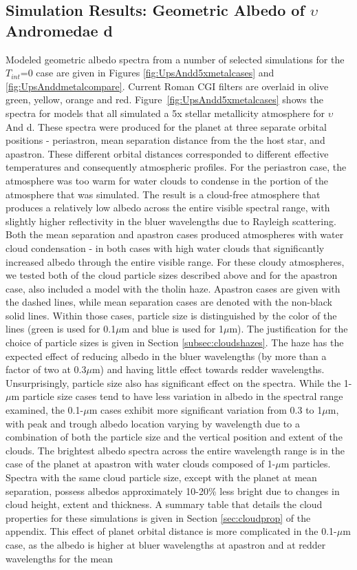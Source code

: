 \documentclass[12pt, letterpaper]{aastex631}
\begin{document}
\subsection{Simulation Results: Geometric Albedo of $\upsilon$ Andromedae d} \label{subsec:geoalbedo}

Modeled geometric albedo spectra from a number of selected simulations for the $T_{int}$=0 case are given in Figures \ref{fig:UpsAndd5xmetalcases} and \ref{fig:UpsAnddmetalcompare}. Current Roman CGI filters are overlaid in olive green, yellow, orange and red.  Figure~\ref{fig:UpsAndd5xmetalcases} shows the spectra for models that all simulated a 5x stellar metallicity atmosphere for $\upsilon$ And d.  These spectra were produced for the planet at three separate orbital positions - periastron, mean separation distance from the the host star, and apastron.  These different orbital distances corresponded to different effective temperatures and consequently atmospheric profiles.  For the periastron case, the atmosphere was too warm for water clouds to condense in the portion of the atmosphere that was simulated.  The result is a cloud-free atmosphere that produces a relatively low albedo across the entire visible spectral range, with slightly higher reflectivity in the bluer wavelengths due to Rayleigh scattering. Both the mean separation and apastron cases produced atmospheres with water cloud condensation - in both cases with high water clouds that significantly increased albedo through the entire visible range. For these cloudy atmospheres, we tested both of the cloud particle sizes described above and for the apastron case, also included a model with the tholin haze.  Apastron cases are given with the dashed lines, while mean separation cases are denoted with the non-black solid lines.  Within those cases, particle size is distinguished by the color of the lines (green is used for 0.1\;$\mu$m and blue is used for 1\;$\mu$m). The justification for the choice of particle sizes is given in Section \ref{subsec:cloudshazes}. The haze has the expected effect of reducing albedo in the bluer wavelengths (by more than a factor of two at 0.3\;$\mu$m) and having little effect towards redder wavelengths.  Unsurprisingly, particle size also has significant effect on the spectra.  While the 1-$\mu$m particle size cases tend to have less variation in albedo in the spectral range examined, the 0.1-$\mu$m cases exhibit more significant variation from 0.3 to 1\;$\mu$m, with peak and trough albedo location varying by wavelength due to a combination of both the particle size and the vertical position and extent of the clouds.  The brightest albedo spectra across the entire wavelength range is in the case of the planet at apastron with water clouds composed of 1-$\mu$m particles.  Spectra with the same cloud particle size, except with the planet at mean separation, possess albedos approximately 10-20\% less bright due to changes in cloud height, extent and thickness. A summary table that details the cloud properties for these simulations is given in Section \ref{sec:cloudprop} of the appendix.  This effect of planet orbital distance is more complicated in the 0.1-$\mu$m case, as the albedo is higher at bluer wavelengths at apastron and at redder wavelengths for the mean 
\end{document}
